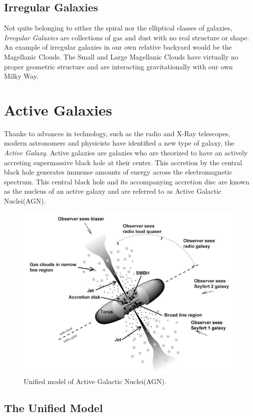\documentclass[12pt, oneside]{smuthesis}
\begin{document}
\subsection{\sc Irregular Galaxies} \label{irregularGalaxies}

Not quite belonging to either the spiral nor the elliptical classes of galaxies, \textit{Irregular Galaxies} are collections of gas and dust with no real structure or shape. An example of irregular galaxies in our own relative backyard would be the Magellanic Clouds. The Small and Large Magellanic Clouds have virtually no proper geometric structure and are interacting gravitationally with our own Milky Way.

\section{\sc Active Galaxies} \label{activeGalaxies}

Thanks to advances in technology, such as the radio and X-Ray telescopes, modern astronomers and physicists have identified a new type of galaxy, the \textit{Active Galaxy}. Active galaxies are galaxies who are theorized to have an actively accreting supermassive black hole at their center. This accretion by the central black hole generates immense amounts of energy across the electromagnetic spectrum. This central black hole and its accompanying accretion disc are known as the nucleus of an active galaxy and are referred to as Active Galactic Nuclei(AGN).

\begin{figure}
	\centering
	\includegraphics[width=0.6\linewidth]{UnifiedModel}
	\caption{Unified model of Active Galactic Nuclei(AGN).}
	\label{fig:unifiedModel}
\end{figure}

\subsection{\sc The Unified Model} \label{unifiedModel}
\end{document}
